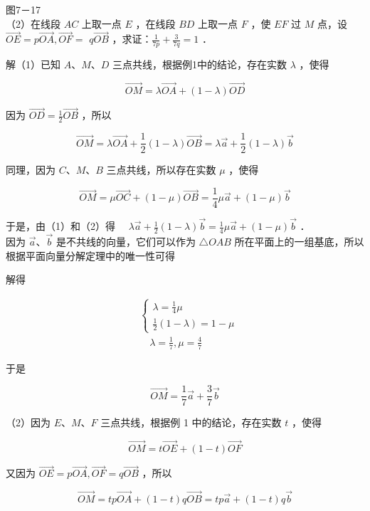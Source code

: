 \documentclass[10pt]{article}
\begin{document}
图7－17\\
（2）在线段 \(A C\) 上取一点 \(E\) ，在线段 \(B D\) 上取一点 \(F\) ，使 \(E F\) 过 \(M\) 点，设 \(\overrightarrow{O E}=p \overrightarrow{O A}, \overrightarrow{O F}=\) \(q \overrightarrow{O B}\) ，求证：\(\frac{1}{7 p}+\frac{3}{7 q}=1\) ．

解（1）已知 \(A 、 M 、 D\) 三点共线，根据例1中的结论，存在实数 \(\lambda\) ，使得

\[
\overrightarrow{O M}=\lambda \overrightarrow{O A}+(1-\lambda) \overrightarrow{O D}
\]

因为 \(\overrightarrow{O D}=\frac{1}{2} \overrightarrow{O B}\) ，所以

\[
\overrightarrow{O M}=\lambda \overrightarrow{O A}+\frac{1}{2}(1-\lambda) \overrightarrow{O B}=\lambda \vec{a}+\frac{1}{2}(1-\lambda) \vec{b}
\]

同理，因为 \(C 、 M 、 B\) 三点共线，所以存在实数 \(\mu\) ，使得

\[
\overrightarrow{O M}=\mu \overrightarrow{O C}+(1-\mu) \overrightarrow{O B}=\frac{1}{4} \mu \vec{a}+(1-\mu) \vec{b}
\]

于是，由（1）和（2）得 \(\quad \lambda \vec{a}+\frac{1}{2}(1-\lambda) \vec{b}=\frac{1}{4} \mu \vec{a}+(1-\mu) \vec{b}\) ．\\
因为 \(\vec{a} 、 \vec{b}\) 是不共线的向量，它们可以作为 \(\triangle O A B\) 所在平面上的一组基底，所以根据平面向量分解定理中的唯一性可得

解得

\[
\begin{aligned}
& \left\{\begin{array}{l}
\lambda=\frac{1}{4} \mu \\
\frac{1}{2}(1-\lambda)=1-\mu
\end{array}\right. \\
& \quad \lambda=\frac{1}{7}, \mu=\frac{4}{7}
\end{aligned}
\]

于是

\[
\overrightarrow{O M}=\frac{1}{7} \vec{a}+\frac{3}{7} \vec{b}
\]

（2）因为 \(E 、 M 、 F\) 三点共线，根据例 1 中的结论，存在实数 \(t\) ，使得

\[
\overrightarrow{O M}=t \overrightarrow{O E}+(1-t) \overrightarrow{O F}
\]

又因为 \(\overrightarrow{O E}=p \overrightarrow{O A}, \overrightarrow{O F}=q \overrightarrow{O B}\) ，所以

\[
\overrightarrow{O M}=t p \overrightarrow{O A}+(1-t) q \overrightarrow{O B}=t p \vec{a}+(1-t) q \vec{b}
\]
\end{document}
